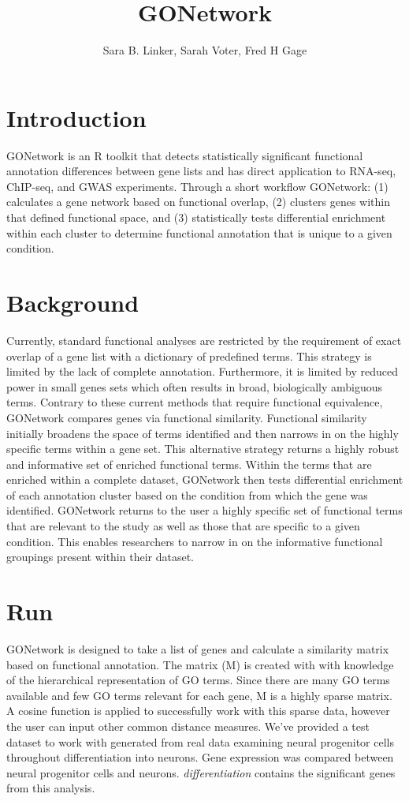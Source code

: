 \documentclass{article}
\title{GONetwork}
\author{Sara B. Linker, Sarah Voter, Fred H Gage}
\begin{document}
\maketitle


\section*{Introduction}
GONetwork is an R toolkit that detects statistically significant functional annotation differences between gene lists and has direct application to RNA-seq, ChIP-seq, and GWAS experiments. Through a short workflow GONetwork: (1) calculates a gene network based on functional overlap, (2) clusters genes within that defined functional space, and (3) statistically tests differential enrichment within each cluster to determine functional annotation that is unique to a given condition.


 \section*{Background}
Currently, standard functional analyses are restricted by the requirement of exact overlap of a gene list with a dictionary of predefined terms. This strategy is limited by the lack of complete annotation. Furthermore, it is limited by reduced power in small genes sets which often results in broad, biologically ambiguous terms. Contrary to these current methods that require functional equivalence, GONetwork compares genes via functional similarity. Functional similarity initially broadens the space of terms identified and then narrows in on the highly specific terms within a gene set. This alternative strategy returns a highly robust and informative set of enriched functional terms. Within the terms that are enriched within a complete dataset, GONetwork then tests differential enrichment of each annotation cluster based on the condition from which the gene was identified. GONetwork returns to the user a highly specific set of functional terms that are relevant to the study as well as those that are specific to a given condition. This enables researchers to narrow in on the informative functional groupings present within their dataset.



\section*{Run}
GONetwork is designed to take a list of genes and calculate a similarity matrix based on functional annotation. The matrix (M) is created with with knowledge of the hierarchical representation of GO terms. Since there are many GO terms available and few GO terms relevant for each gene, M is a highly sparse matrix. A cosine function is applied to successfully work with this sparse data, however the user can input other common distance measures. We've provided a test dataset to work with generated from real data examining neural progenitor cells throughout differentiation into neurons. Gene expression was compared between neural progenitor cells and neurons. \textsl{differentiation} contains the significant genes from this analysis.
\end{document}
